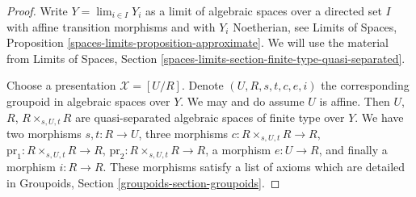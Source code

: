 \begin{proof}
Write $Y = \lim_{i \in I} Y_i$ as a limit of algebraic spaces
over a directed set $I$ with affine transition morphisms and
with $Y_i$ Noetherian, see
Limits of Spaces, Proposition \ref{spaces-limits-proposition-approximate}.
We will use the material from
Limits of Spaces, Section
\ref{spaces-limits-section-finite-type-quasi-separated}.

\medskip\noindent
Choose a presentation $\mathcal{X} = [U/R]$.
Denote $(U, R, s, t, c, e, i)$ the corresponding groupoid
in algebraic spaces over $Y$. We may and do assume $U$ is affine.
Then $U$, $R$, $R \times_{s, U, t} R$ are quasi-separated
algebraic spaces of finite type over $Y$. We have two morphisms
$s, t : R \to U$, three morphisms
$c : R \times_{s, U, t} R \to R$,
$\text{pr}_1 : R \times_{s, U, t} R \to R$,
$\text{pr}_2 : R \times_{s, U, t} R \to R$,
a morphism $e : U \to R$, and finally a morphism $i : R \to R$.
These morphisms satisfy a list of axioms which are detailed
in Groupoids, Section \ref{groupoids-section-groupoids}.


\end{proof}
